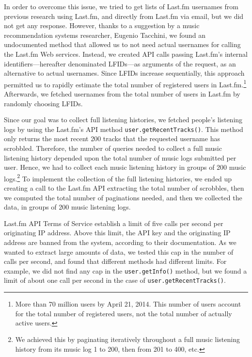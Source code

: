 In order to overcome this issue, we tried to get lists of Last.fm usernames from previous research using Last.fm, and directly from Last.fm via email, but we did not get any response. However, thanks to a suggestion by a music recommendation systems researcher, Eugenio Tacchini, we found an undocumented method that allowed us to not need actual usernames for calling the Last.fm Web services. Instead, we created API calls passing Last.fm's internal identifiers---hereafter denominated LFIDs---as arguments of the request, as an alternative to actual usernames.
Since LFIDs increase sequentially, this approach permitted us to rapidly estimate the total number of registered users in Last.fm.\footnote{More than 70 million users by April 21, 2014. This number of users account for the total number of registered users, not the total number of actually active users.} Afterwards, we fetched usernames from the total number of users in Last.fm by randomly choosing LFIDs.

Since our goal was to collect full listening histories, we fetched people's listening logs by using the Last.fm's API method {\tt user.getRecentTracks()}. This method only returns the most recent 200 tracks that the requested username has scrobbled. 
Therefore, the number of queries needed to collect a full music listening history depended upon the total number of music logs submitted per user. Hence, we had to collect each music listening history in groups of 200 music logs.\footnote{We achieved this by paginating iteratively throughout a full music listening history from its music log 1 to 200, then from 201 to 400, etc.} 
To implement the collection of the full listening histories, we ended up creating a call to the Last.fm API extracting the total number of scrobbles, then we computed the total number of paginations needed, and then we collected the data, in groups of 200 music listening logs.


Last.fm API Terms of Service establish a limit of five calls per second per originating IP address. Above this limit, the API key and the  originating IP address are banned from the system, according to their documentation. As we wanted to extract large amounts of data, we tested this cap in the number of calls per second, and found that different methods had different limits. For example, we did not find any cap in the {\tt user.getInfo()} method, but we found a limit of about one call per second in the case of {\tt user.getRecentTracks()}. 

